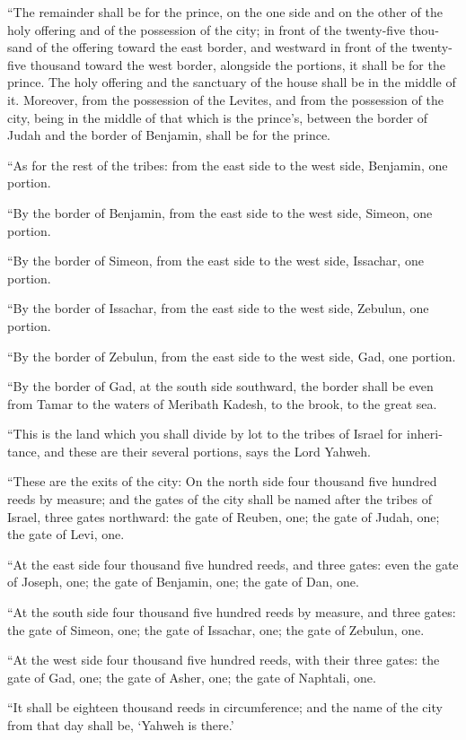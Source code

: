 \begin{paracol}{2}
\begin{otherlanguage}{english}
 ``The remainder shall be for the prince, on the one side
and on the other of the holy offering and of the possession of the city;
in front of the twenty-five thousand of the offering toward the east
border, and westward in front of the twenty-five thousand toward the
west border, alongside the portions, it shall be for the prince. The
holy offering and the sanctuary of the house shall be in the middle of
it.  Moreover, from the possession of the Levites, and
from the possession of the city, being in the middle of that which is
the prince's, between the border of Judah and the border of Benjamin,
shall be for the prince.

 ``As for the rest of the tribes: from the east side to
the west side, Benjamin, one portion.

 ``By the border of Benjamin, from the east side to the
west side, Simeon, one portion.

 ``By the border of Simeon, from the east side to the
west side, Issachar, one portion.

 ``By the border of Issachar, from the east side to the
west side, Zebulun, one portion.

 ``By the border of Zebulun, from the east side to the
west side, Gad, one portion.

 ``By the border of Gad, at the south side southward, the
border shall be even from Tamar to the waters of Meribath Kadesh, to the
brook, to the great sea.

 ``This is the land which you shall divide by lot to the
tribes of Israel for inheritance, and these are their several portions,
says the Lord Yahweh.

 ``These are the exits of the city: On the north side
four thousand five hundred reeds by measure;  and the
gates of the city shall be named after the tribes of Israel, three gates
northward: the gate of Reuben, one; the gate of Judah, one; the gate of
Levi, one.

 ``At the east side four thousand five hundred reeds, and
three gates: even the gate of Joseph, one; the gate of Benjamin, one;
the gate of Dan, one.

 ``At the south side four thousand five hundred reeds by
measure, and three gates: the gate of Simeon, one; the gate of Issachar,
one; the gate of Zebulun, one.

 ``At the west side four thousand five hundred reeds,
with their three gates: the gate of Gad, one; the gate of Asher, one;
the gate of Naphtali, one.

 ``It shall be eighteen thousand reeds in circumference;
and the name of the city from that day shall be, `Yahweh is there.'
\end{otherlanguage} \end{paracol}
